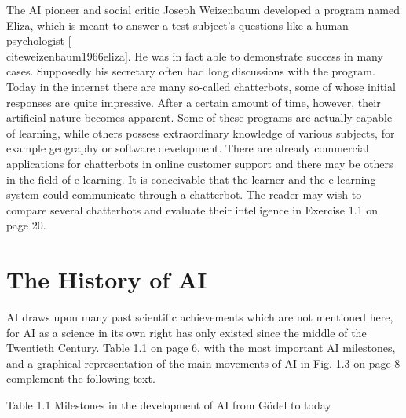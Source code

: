 \documentclass[10pt]{book}
\begin{document}
The AI pioneer and social critic Joseph Weizenbaum developed a program named Eliza, which is meant to answer a test subject's questions like a human psychologist [\\cite{weizenbaum1966eliza}]. He was in fact able to demonstrate success in many cases. Supposedly his secretary often had long discussions with the program. Today in the internet there are many so-called chatterbots, some of whose initial responses are quite impressive. After a certain amount of time, however, their artificial nature becomes apparent. Some of these programs are actually capable of learning, while others possess extraordinary knowledge of various subjects, for example geography or software development. There are already commercial applications for chatterbots in online customer support and there may be others in the field of e-learning. It is conceivable that the learner and the e-learning system could communicate through a chatterbot. The reader may wish to compare several chatterbots and evaluate their intelligence in Exercise 1.1 on page 20.

\section{The History of AI}
AI draws upon many past scientific achievements which are not mentioned here, for AI as a science in its own right has only existed since the middle of the Twentieth Century. Table 1.1 on page 6, with the most important AI milestones, and a graphical representation of the main movements of AI in Fig. 1.3 on page 8 complement the following text.

Table 1.1 Milestones in the development of AI from Gödel to today
\end{document}
